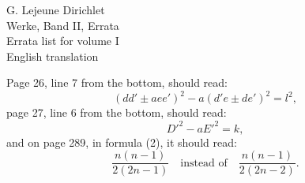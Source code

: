 \documentclass[11pt]{article}
\newcommand{\paperhead}[3]{\begin{center}{\Large G. Lejeune Dirichlet}\\[0.25em]{\large Werke, Band II, #1}\\[0.75em]{\LARGE #2}\\[0.35em]{\large #3}\end{center}\bigskip}
\begin{document}
\paperhead{Errata}{Errata list for volume I}{English translation}

Page 26, line 7 from the bottom, should read:
\[
(dd'\pm aee')^2-a(d'e\pm de')^2=l^2,
\]
page 27, line 6 from the bottom, should read:
\[
D'^2-aE'^2=k,
\]
and on page 289, in formula (2), it should read:
\[
\frac{n(n-1)}{2(2n-1)}
\quad\text{instead of}\quad
\frac{n(n-1)}{2(2n-2)}.
\]
\end{document}
